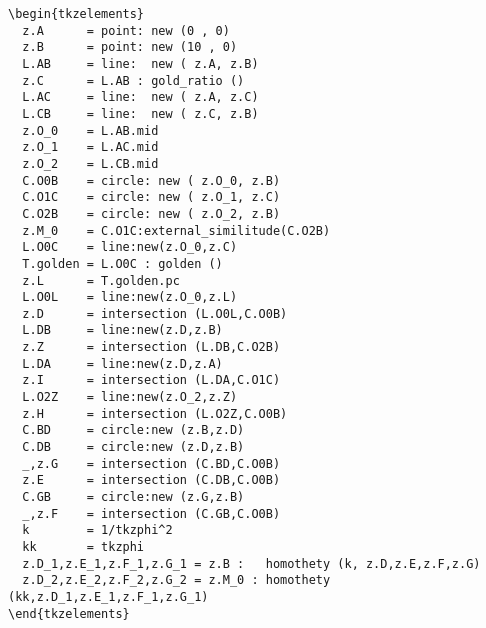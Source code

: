 \begin{minipage}{.5\textwidth}
\begin{Verbatim}
\begin{tkzelements}
  z.A      = point: new (0 , 0)
  z.B      = point: new (10 , 0)
  L.AB     = line:  new ( z.A, z.B)
  z.C      = L.AB : gold_ratio ()
  L.AC     = line:  new ( z.A, z.C)
  L.CB     = line:  new ( z.C, z.B)
  z.O_0    = L.AB.mid
  z.O_1    = L.AC.mid
  z.O_2    = L.CB.mid
  C.O0B    = circle: new ( z.O_0, z.B)
  C.O1C    = circle: new ( z.O_1, z.C)
  C.O2B    = circle: new ( z.O_2, z.B)
  z.M_0    = C.O1C:external_similitude(C.O2B)
  L.O0C    = line:new(z.O_0,z.C)
  T.golden = L.O0C : golden ()
  z.L      = T.golden.pc
  L.O0L    = line:new(z.O_0,z.L)
  z.D      = intersection (L.O0L,C.O0B)
  L.DB     = line:new(z.D,z.B)
  z.Z      = intersection (L.DB,C.O2B)
  L.DA     = line:new(z.D,z.A)
  z.I      = intersection (L.DA,C.O1C)
  L.O2Z    = line:new(z.O_2,z.Z)
  z.H      = intersection (L.O2Z,C.O0B)
  C.BD     = circle:new (z.B,z.D)
  C.DB     = circle:new (z.D,z.B)
  _,z.G    = intersection (C.BD,C.O0B)
  z.E      = intersection (C.DB,C.O0B)
  C.GB     = circle:new (z.G,z.B)
  _,z.F    = intersection (C.GB,C.O0B)
  k        = 1/tkzphi^2
  kk       = tkzphi
  z.D_1,z.E_1,z.F_1,z.G_1 = z.B :   homothety (k, z.D,z.E,z.F,z.G)
  z.D_2,z.E_2,z.F_2,z.G_2 = z.M_0 : homothety (kk,z.D_1,z.E_1,z.F_1,z.G_1)
\end{tkzelements}
\end{Verbatim}
\end{minipage}
\begin{minipage}{.5\textwidth}
  \hfill
{}
\end{minipage}

